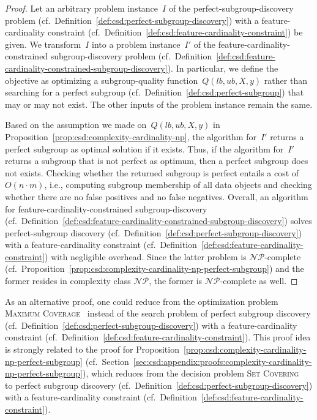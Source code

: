 \documentclass{article}
\theoremstyle{definition}
\begin{document}
\begin{proof}
Let an arbitrary problem instance~$I$ of the perfect-subgroup-discovery problem (cf.~Definition~\ref{def:csd:perfect-subgroup-discovery}) with a feature-cardinality constraint (cf.~Definition~\ref{def:csd:feature-cardinality-constraint}) be given.
We transform~$I$ into a problem instance~$I'$ of the feature-cardinality-constrained subgroup-discovery problem (cf.~Definition~\ref{def:csd:feature-cardinality-constrained-subgroup-discovery}).
In particular, we define the objective as optimizing a subgroup-quality function~$Q(\mathit{lb}, \mathit{ub}, X, y)$ rather than searching for a perfect subgroup (cf.~Definition~\ref{def:csd:perfect-subgroup}) that may or may not exist.
The other inputs of the problem instance remain the same.

Based on the assumption we made on~$Q(\mathit{lb}, \mathit{ub}, X, y)$ in Proposition~\ref{prop:csd:complexity-cardinality-np}, the algorithm for~$I'$ returns a perfect subgroup as optimal solution if it exists.
Thus, if the algorithm for~$I'$ returns a subgroup that is not perfect as optimum, then a perfect subgroup does not exists.
Checking whether the returned subgroup is perfect entails a cost of $O(n \cdot m)$, i.e., computing subgroup membership of all data objects and checking whether there are no false positives and no false negatives.
Overall, an algorithm for feature-cardinality-constrained subgroup-discovery (cf.~Definition~\ref{def:csd:feature-cardinality-constrained-subgroup-discovery}) solves perfect-subgroup discovery (cf.~Definition~\ref{def:csd:perfect-subgroup-discovery}) with a feature-cardinality constraint (cf.~Definition~\ref{def:csd:feature-cardinality-constraint}) with negligible overhead.
Since the latter problem is $\mathcal{NP}$-complete (cf.~Proposition~\ref{prop:csd:complexity-cardinality-np-perfect-subgroup}) and the former resides in complexity class $\mathcal{NP}$, the former is $\mathcal{NP}$-complete as well.
\end{proof}
%
As an alternative proof, one could reduce from the optimization problem \textsc{Maximum Coverage}~\cite{chekuri2004maximum} instead of the search problem of perfect subgroup discovery (cf.~Definition~\ref{def:csd:perfect-subgroup-discovery}) with a feature-cardinality constraint (cf.~Definition~\ref{def:csd:feature-cardinality-constraint}).
This proof idea is strongly related to the proof for Proposition~\ref{prop:csd:complexity-cardinality-np-perfect-subgroup} (cf.~Section~\ref{sec:csd:appendix:proofs:complexity-cardinality-np-perfect-subgroup}), which reduces from the decision problem \textsc{Set Covering}~\cite{karp1972reducibility} to perfect subgroup discovery (cf.~Definition~\ref{def:csd:perfect-subgroup-discovery}) with a feature-cardinality constraint (cf.~Definition~\ref{def:csd:feature-cardinality-constraint}).
\end{document}
